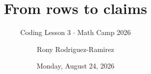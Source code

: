 \title[API 209 \(\cdot\) MATH CAMP 2026 \(\cdot\) LESSON 3]{From rows to claims}
\subtitle{Coding Lesson 3 \(\cdot\) Math Camp 2026}
\author{Rony Rodriguez-Ramirez}
\date{Monday, August 24, 2026}

